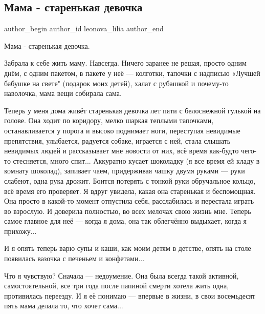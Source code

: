  
 
 
 
 

\subsection{Мама - старенькая девочка}
\label{sec:27_11_2020.fb.group.rrr.2.mama}

\ifcmt
  author_begin
   author_id leonova_lilia
  author_end
\fi

Мама - старенькая девочка.

Забрала к себе жить маму. Навсегда. Ничего заранее не решая, просто одним днём,
с одним пакетом, в пакете у неё --- колготки, тапочки с надписью «Лучшей бабушке
на свете" (подарок моих детей), халат с рубашкой и почему-то наволочка, мама
вещи собирала сама.

Теперь у меня дома живёт старенькая девочка лет пяти с белоснежной гулькой на
голове. Она ходит по коридору, мелко шаркая теплыми тапочками, останавливается
у порога и высоко поднимает ноги, переступая невидимые препятствия, улыбается,
радуется собаке, играется с ней, стала слышать невидимых людей и рассказывает
мне новости от них, всё время как-будто чего-то стесняется, много спит...
Аккуратно кусает шоколадку (я все время ей кладу в комнату шоколад), запивает
чаем, придерживая чашку двумя руками --- руки слабеют, одна рука дрожит.  Боится
потерять с тонкой руки обручальное кольцо, всё время его проверяет. Я вдруг
увидела, какая она старенькая и беспомощная. Она просто в какой-то момент
отпустила себя, расслабилась и перестала играть во взрослую.  И доверила
полностью, во всех мелочах свою жизнь мне. Теперь самое главное для неё --- когда
я дома, она так облегчённо выдыхает, когда я прихожу...

И я опять теперь варю супы и каши, как моим детям в детстве, опять на столе
появилась вазочка с печеньем и конфетами...

Что я чувствую? Сначала --- недоумение. Она была всегда такой активной,
самостоятельной,  все три года после папиной смерти хотела жить одна,
противилась переезду.  И я её понимаю --- впервые в жизни, в свои восемьдесят
пять мама делала то, что хочет сама...

